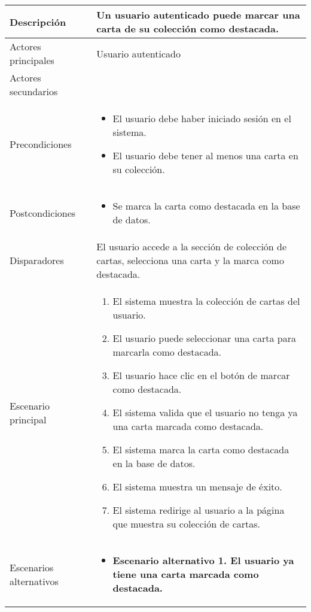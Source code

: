 \begin{longtable}{
    >{\columncolor{lightgreen!20}}p{4cm}
    p{12cm}
    }
    \midrule
    Descripción & Un usuario autenticado puede marcar una carta de su colección como destacada. \\
    \midrule
    Actores principales & Usuario autenticado \\
    \midrule
    Actores secundarios &  \\
    \midrule
    Precondiciones & \begin{itemize}[nosep,leftmargin=*]
        \item El usuario debe haber iniciado sesión en el sistema.
        \item El usuario debe tener al menos una carta en su colección.
    \end{itemize} \\
    \midrule
    Postcondiciones & \begin{itemize}[nosep,leftmargin=*]
        \item Se marca la carta como destacada en la base de datos.
    \end{itemize} \\
    \midrule
    Disparadores & El usuario accede a la sección de colección de cartas, selecciona una carta y la marca como destacada. \\
    \midrule
    Escenario principal & \begin{enumerate}[nosep,leftmargin=*]
        \item El sistema muestra la colección de cartas del usuario.
        \item El usuario puede seleccionar una carta para marcarla como destacada.
        \item El usuario hace clic en el botón de marcar como destacada.
        \item El sistema valida que el usuario no tenga ya una carta marcada como destacada.
        \item El sistema marca la carta como destacada en la base de datos.
        \item El sistema muestra un mensaje de éxito.
        \item El sistema redirige al usuario a la página que muestra su colección de cartas.
    \end{enumerate} \\
    \midrule
    Escenarios alternativos & 
    \begin{itemize}[nosep,leftmargin=*]
        \item \textbf{Escenario alternativo 1. El usuario ya tiene una carta marcada como destacada.}
        \begin{enumerate}[nosep,leftmargin=*]

\end{enumerate}
\end{itemize}
\end{longtable}
